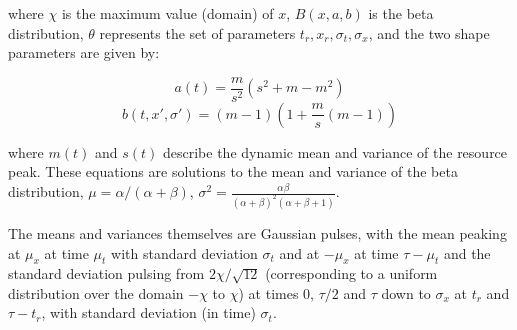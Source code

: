 \documentclass[utf8]{frontiersSCNS} %
\begin{document}
where $\chi$ is the maximum value (domain) of $x$, $B(x, a, b)$ is the beta distribution, $\theta$ represents the set of parameters $t_r, x_r, \sigma_t, \sigma_x$, and the two shape parameters are given by:

$$a(t) = \frac{m}{s^2}( s^2 + m - m^2)$$
$$b(t, x', \sigma') = (m-1)\left(1 + \frac{m}{s}(m-1)\right) $$

where $m(t)$ and $s(t)$ describe the dynamic mean and variance of the resource peak.  These equations are solutions to the mean and variance of the beta distribution, $\mu = \alpha/(\alpha + \beta)$, $\sigma^2 = \frac{\alpha\beta}{(\alpha+\beta)^2(\alpha+\beta+1)}$.

The means and variances themselves are Gaussian pulses, with the mean peaking at $\mu_x$ at time $\mu_t$ with standard deviation $\sigma_t$ and at $-\mu_x$ at time $\tau - \mu_t$ and the standard deviation pulsing from $2 \chi/\sqrt{12}$ (corresponding to a uniform distribution over the domain $-\chi$ to $\chi$) at times 0, $\tau/2$ and $\tau$ down to $\sigma_x$ at $t_r$ and $\tau - t_r$, with standard deviation (in time) $\sigma_t$. 
\end{document}
